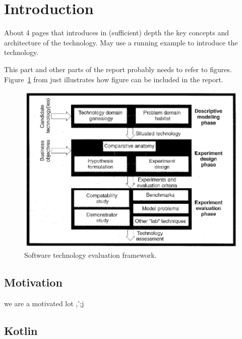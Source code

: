 \section{Introduction}
\label{sec:background}

About 4 pages that introduces in (sufficient) depth the key concepts
and architecture of the technology.  May use a running example to
introduce the technology.

This part and other parts of the report probably needs to refer to
figures. Figure~\ref{fig:framework} from \cite{brown:96} just
illustrates how figure can be included in the report.

\begin{figure}
  \centering
  \includegraphics[scale=0.5]{figs/framework.png}
  \caption{Software technology evaluation framework.}
  \label{fig:framework}
\end{figure}


\subsection{Motivation}
we are a motivated lot ,';j

\subsection{Kotlin}

